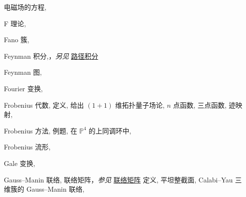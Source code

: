 \begin{theindex}
\subitem \leavevmode\hypertarget{idx:0275}{电磁场的方程},\enspace{}
\indexspace
\item \leavevmode\hypertarget{idx:0295}{F 理论},\enspace{}
\indexspace
\item \leavevmode\hypertarget{idx:0308}{Fano 簇},\enspace{}
\indexspace
\item \leavevmode\hypertarget{idx:0315}{Feynman 积分},\enspace{}，\textit{另见} \hyperlink{idx:1037}{路径积分}
\indexspace
\item \leavevmode\hypertarget{idx:0314}{Feynman 图},\enspace{}
\indexspace
\item \leavevmode\hypertarget{idx:0336}{Fourier 变换},\enspace{}
\indexspace
\item \leavevmode\hypertarget{idx:0337}{Frobenius 代数},\enspace{}
\subitem \leavevmode\hypertarget{idx:0338}{定义},\enspace{}
\subitem \leavevmode\hypertarget{idx:0339}{给出 $(1+1)$ 维拓扑量子场论},\enspace{}
\subitem \leavevmode\hypertarget{idx:0340}{$n$ 点函数},\enspace{}
\subitem \leavevmode\hypertarget{source:480}{}\hypertarget{idx:0341}{三点函数},\enspace{}
\subitem \leavevmode\hypertarget{idx:0342}{迹映射},\enspace{}
\indexspace
\item \leavevmode\hypertarget{idx:0344}{Frobenius 方法},\enspace{}
\subitem \leavevmode\hypertarget{idx:0345}{例题},\enspace{}
\subitem \leavevmode\hypertarget{idx:0346}{在 $\mathbb P^4$ 的上同调环中},\enspace{}
\indexspace
\item \leavevmode\hypertarget{idx:0343}{Frobenius 流形},\enspace{}
\indexspace
\item \leavevmode\hypertarget{idx:0348}{Gale 变换},\enspace{}
\indexspace
\item \leavevmode\hypertarget{idx:0365}{Gauss--Manin 联络},\enspace{}
\subitem \leavevmode\hypertarget{idx:0366}{联络矩阵}，\textit{参见} \hyperlink{idx:0174}{联络矩阵}
\subitem \leavevmode\hypertarget{idx:0367}{定义},\enspace{}
\subitem \leavevmode\hypertarget{idx:0368}{平坦整截面},\enspace{}
\subitem \leavevmode\hypertarget{idx:0369}{Calabi--Yau 三维簇的 Gauss--Manin 联络},\enspace{}

\end{theindex}
